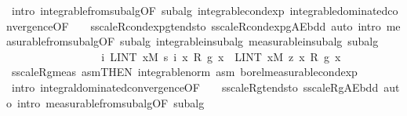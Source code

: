 \begin{isabellebody}
\ {\isacharparenleft}{\kern0pt}intro\ integrable{\isacharunderscore}{\kern0pt}from{\isacharunderscore}{\kern0pt}subalg{\isacharbrackleft}{\kern0pt}OF\ subalg{\isacharbrackright}{\kern0pt}\ integrable{\isacharunderscore}{\kern0pt}cond{\isacharunderscore}{\kern0pt}exp\ integrable{\isacharunderscore}{\kern0pt}dominated{\isacharunderscore}{\kern0pt}convergence{\isacharbrackleft}{\kern0pt}OF\ {\isacharunderscore}{\kern0pt}\ {\isacharunderscore}{\kern0pt}\ {\isacharunderscore}{\kern0pt}\ s{\isacharunderscore}{\kern0pt}scaleR{\isacharunderscore}{\kern0pt}cond{\isacharunderscore}{\kern0pt}exp{\isacharunderscore}{\kern0pt}g{\isacharunderscore}{\kern0pt}tendsto\ s{\isacharunderscore}{\kern0pt}scaleR{\isacharunderscore}{\kern0pt}cond{\isacharunderscore}{\kern0pt}exp{\isacharunderscore}{\kern0pt}g{\isacharunderscore}{\kern0pt}AE{\isacharunderscore}{\kern0pt}bdd{\isacharbrackright}{\kern0pt}{\isacharparenright}{\kern0pt}\ {\isacharparenleft}{\kern0pt}auto\ intro{\isacharcolon}{\kern0pt}\ measurable{\isacharunderscore}{\kern0pt}from{\isacharunderscore}{\kern0pt}subalg{\isacharbrackleft}{\kern0pt}OF\ subalg{\isacharbrackright}{\kern0pt}\ integrable{\isacharunderscore}{\kern0pt}in{\isacharunderscore}{\kern0pt}subalg\ measurable{\isacharunderscore}{\kern0pt}in{\isacharunderscore}{\kern0pt}subalg\ subalg{\isacharparenright}{\kern0pt}\isanewline
\ \ \ \ \ \ \ \ \ \isanewline
\ \ \ \ \ \ \isamarkupfalse%
\ {\isachardoublequoteopen}{\isacharparenleft}{\kern0pt}{\isasymlambda}i{\isachardot}{\kern0pt}\ LINT\ x{\isacharbar}{\kern0pt}M{\isachardot}{\kern0pt}\ s\ i\ x\ {\isacharasterisk}{\kern0pt}\isactrlsub R\ g\ x{\isacharparenright}{\kern0pt}\ {\isasymlonglonglongrightarrow}\ LINT\ x{\isacharbar}{\kern0pt}M{\isachardot}{\kern0pt}\ z\ x\ {\isacharasterisk}{\kern0pt}\isactrlsub R\ g\ x{\isachardoublequoteclose}\ \isamarkupfalse%
\ s{\isacharunderscore}{\kern0pt}scaleR{\isacharunderscore}{\kern0pt}g{\isacharunderscore}{\kern0pt}meas\ asm{\isacharparenleft}{\kern0pt}{}{\isacharparenright}{\kern0pt}{\isacharbrackleft}{\kern0pt}THEN\ integrable{\isacharunderscore}{\kern0pt}norm{\isacharbrackright}{\kern0pt}\ asm{\isacharprime}{\kern0pt}\ borel{\isacharunderscore}{\kern0pt}measurable{\isacharunderscore}{\kern0pt}cond{\isacharunderscore}{\kern0pt}exp{\isacharprime}{\kern0pt}\ \isamarkupfalse%
\ {\isacharparenleft}{\kern0pt}intro\ integral{\isacharunderscore}{\kern0pt}dominated{\isacharunderscore}{\kern0pt}convergence{\isacharbrackleft}{\kern0pt}OF\ {\isacharunderscore}{\kern0pt}\ {\isacharunderscore}{\kern0pt}\ {\isacharunderscore}{\kern0pt}\ s{\isacharunderscore}{\kern0pt}scaleR{\isacharunderscore}{\kern0pt}g{\isacharunderscore}{\kern0pt}tendsto\ s{\isacharunderscore}{\kern0pt}scaleR{\isacharunderscore}{\kern0pt}g{\isacharunderscore}{\kern0pt}AE{\isacharunderscore}{\kern0pt}bdd{\isacharbrackright}{\kern0pt}{\isacharparenright}{\kern0pt}\ {\isacharparenleft}{\kern0pt}auto\ intro{\isacharcolon}{\kern0pt}\ measurable{\isacharunderscore}{\kern0pt}from{\isacharunderscore}{\kern0pt}subalg{\isacharbrackleft}{\kern0pt}OF\ subalg{\isacharbrackright}{\kern0pt}{\isacharparenright}{\kern0pt}\isanewline

\end{isabellebody}

